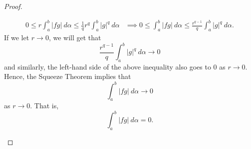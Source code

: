\documentclass[a4paper]{article}
\begin{document}
\begin{proof}
\begin{enumerate}
\begin{enumerate}
        \begin{align*}
            0 \leq r \int_{ a }^{ b }  | fg |  \ d \alpha \leq \frac{ 1 }{ q }  r^{q} \int_{ a }^{ b }  | g |^{q} \ d \alpha &\implies 0 \leq \int_{ a }^{ b }  | fg |  \ d \alpha \leq \frac{ r^{q-1} }{ q  }  \int_{ a }^{ b }  | g |^{q}  \ d \alpha.
        \end{align*}
        If we let \( r \to 0  \), we will get that 
        \[  \frac{ r^{q-1} }{ q  }  \int_{ a }^{ b }  | g |^{q} \ d \alpha \to  0  \]
        and similarly, the left-hand side of the above inequality also goes to \( 0  \) as \( r \to 0 \).
        Hence, the Squeeze Theorem implies that
        \[  \int_{ a }^{ b } | fg |  \ d \alpha \to  0  \]
        as \( r \to 0  \). That is, 
        \[  \int_{ a }^{ b } | fg |  \ d \alpha = 0.  \]
\end{enumerate}
\end{enumerate}
\end{proof}
\end{document}
